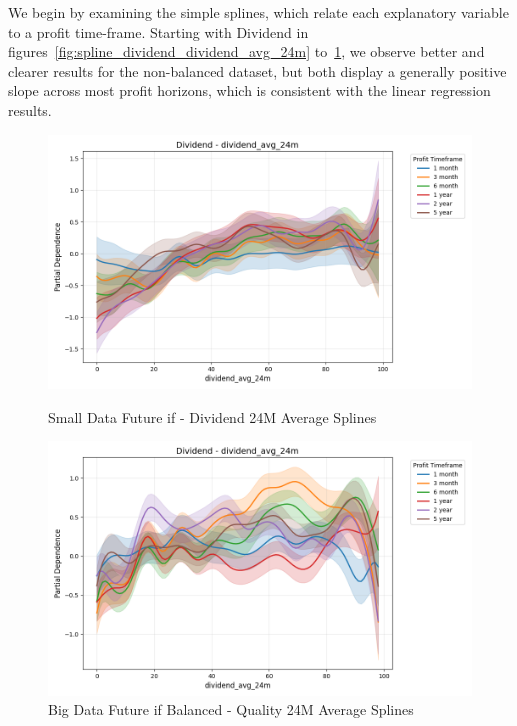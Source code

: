\documentclass[11pt,english,a4paper,hidelinks]{book}
\begin{document}
\noindent We begin by examining the simple splines, which relate each explanatory variable to a profit time-frame. Starting with Dividend in figures~\ref{fig:spline_dividend_dividend_avg_24m} to~\ref{fig:spline_dividend_dividend_avg_24m_balanced}, we observe better and clearer results for the non-balanced dataset, but both display a generally positive slope across most profit horizons, which is consistent with the linear regression results.

\begin{figure}[H]
    \centering
    \begin{minipage}{0.48\textwidth}
        \centering
        \includegraphics[width=\textwidth]{images/code/models/general_regression/splines/2D/Small Data future - IF/dividend_dividend_avg_24m.png}
        \caption{Small Data Future \acrshort{if} - Dividend 24M Average Splines}
        \label{fig:spline_dividend_dividend_avg_24m}
    \end{minipage}\hfill
    \begin{minipage}{0.48\textwidth}
        \centering
        \includegraphics[width=\textwidth]{images/code/models/general_regression/splines/2D/Big Data future - IF HARD Balanced/dividend_dividend_avg_24m.png}
        \caption{Big Data Future \acrshort{if} Balanced - Quality 24M Average Splines}
        \label{fig:spline_dividend_dividend_avg_24m_balanced}
    \end{minipage}
\end{figure}
\end{document}
